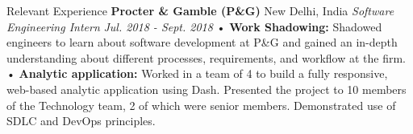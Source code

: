 \documentclass{resume}
\begin{document}
\begin{rSection}{\small{Relevant Experience}}
{\bf \footnotesize Procter \& Gamble (P\&G)}
\hfill {\footnotesize New Delhi, India} \newline
{\footnotesize\textit{{Software Engineering Intern}}} \hfill {\footnotesize \textit{Jul. 2018 - Sept. 2018}} \newline
\indent \indent \indent \footnotesize{ • \textbf{Work Shadowing:} Shadowed engineers to learn about software development at P\&G and gained an in-depth understanding about} \newline
\indent \indent \indent \footnotesize{  different processes, requirements, and workflow at the firm.} \newline
\indent \indent \indent \footnotesize{ • \textbf{Analytic application:} Worked in a team of 4 to build a fully responsive, web-based analytic application using Dash. Presented } \newline
\indent \indent \indent \footnotesize{  the project to 10 members of the Technology team, 2 of which were senior members. Demonstrated use of SDLC and DevOps principles.}

\end{rSection}
\end{document}
